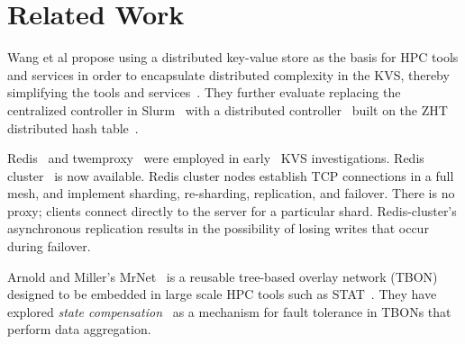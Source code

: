 \section{Related Work}

Wang et al propose using a distributed key-value store
as the basis for HPC tools and services in order to encapsulate
distributed complexity in the KVS, thereby simplifying the
tools and services~\cite{Wang:2013:USE:2503210.2503239}.
They further evaluate replacing the centralized controller in
Slurm~\cite{Jette02slurm} with a distributed controller~\cite{Slurmpp}
built on the ZHT distributed hash table~\cite{Li:2013:ZLR:2510661.2511401}.

Redis~\cite{Redis} and twemproxy~\cite{Twemproxy}
were employed in early \flux\ KVS investigations.
Redis cluster~\cite{RedisClusterTut,RedisClusterSpec} is now available.
Redis cluster nodes establish TCP connections in a full mesh, and implement
sharding, re-sharding, replication, and failover.
There is no proxy; clients connect directly to the server
for a particular shard.  Redis-cluster's asynchronous replication
results in the possibility of losing writes that occur during failover.

Arnold and Miller's MrNet~\cite{mrnet} is a reusable tree-based overlay
network (TBON) designed to be embedded in large scale HPC tools such as
STAT~\cite{STAT}.  They have explored
{\em state compensation}~\cite{conf/ipps/ArnoldM10}
as a mechanism for fault tolerance in TBONs that perform data aggregation.
